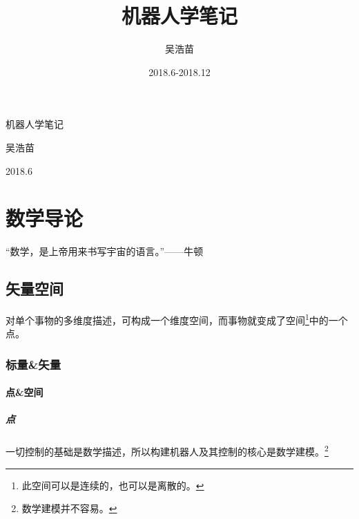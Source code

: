 \documentclass[a4paper,openany,oneside,sub4section]{book}
\newenvironment{boxTip}
{\begin{tcolorbox}
[enhanced jigsaw,breakable,pad at break*=1mm, colback=black!5,colframe=boxOrange]}
{\end{tcolorbox}}
\newenvironment{tip}
               {\begin{boxTip}}
               {\end{boxTip}}
\newenvironment{summary}
{\hspace{10pt}\par\small\it
 \begin{list}{}{\leftmargin=35pt\rightmargin=25pt}
 \item\ignorespaces\advance\baselineskip -1pt}
{\end{list}\vspace{-0.5cm}}
\begin{document}
\title{机器人学笔记}
\author{吴浩苗}
\date{2018.6-2018.12}

\frontmatter
\thispagestyle{empty} %
\begin{titlepage}
	\centering
	\begin{center}
		\vspace*{6cm}
		{\par \Huge {\heiti 机器人学笔记 } }
		\vspace{1cm}
		{\par \LARGE {\lishu  吴浩苗} }
		\vspace{12cm}
        {\par \large 2018.6}
	\end{center}
\end{titlepage}

\setcounter{page}{1}
\tableofcontents			%

\mainmatter %

\setcounter{page}{1}
\part{数学导论}
\cleardoublepage
    \begin{tip} “数学，是上帝用来书写宇宙的语言。”——牛顿 \end{tip}

	\chapter{矢量空间}
\begin{summary}
    对单个事物的多维度描述，可构成一个维度空间，而事物就变成了空间\footnote{此空间可以是连续的，也可以是离散的。}中的一个点。\footnotemark[1]
\end{summary}

		\section{标量\&矢量}
            \subsection{点\&空间}
                \subsubsection{点}
{\par 一切控制的基础是数学描述，所以构建机器人及其控制的核心是数学建模。\footnote{数学建模并不容易。} }
\end{document}
